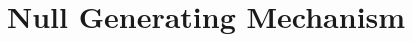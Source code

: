 \documentclass[12]{article}
\newcommand{\red}[1]{{\color{red} #1}}
\begin{document}


\section{Null Generating Mechanism} \label{sec:null}
\end{document}
